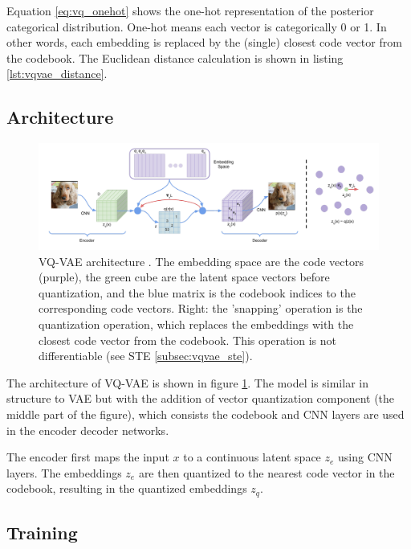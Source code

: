 Equation \ref{eq:vq_onehot} shows the one-hot representation of the posterior categorical distribution. One-hot means each vector is categorically 0 or 1. In other words, each embedding is replaced by the (single) closest code vector from the codebook. The Euclidean distance calculation is shown in listing \ref{lst:vqvae_distance}.


\subsection{Architecture}

\begin{figure}[h]
    \centering
    \includegraphics[width=\textwidth]{images/vqvae_architecture.png}
    \caption{VQ-VAE architecture \cite{vqvae}. The embedding space are the code vectors (purple), the green cube are the latent space vectors before quantization, and the blue matrix is the codebook indices to the corresponding code vectors. Right: the 'snapping' operation is the quantization operation, which replaces the embeddings with the closest code vector from the codebook. This operation is not differentiable (see STE \ref{subsec:vqvae_ste}).}
    \label{fig:vqvae_architecture}
\end{figure}

The architecture of VQ-VAE is shown in figure \ref{fig:vqvae_architecture}. The model is similar in structure to VAE but with the addition of vector quantization component (the middle part of the figure), which consists the codebook and CNN layers are used in the encoder decoder networks.

The encoder first maps the input $x$ to a continuous latent space $z_e$ using CNN layers. The embeddings $z_e$ are then quantized to the nearest code vector in the codebook, resulting in the quantized embeddings $z_q$. 

\subsection{Training}



